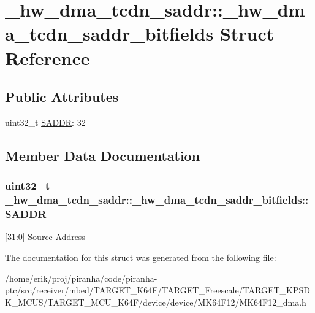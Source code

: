 \hypertarget{struct__hw__dma__tcdn__saddr_1_1__hw__dma__tcdn__saddr__bitfields}{}\section{\+\_\+hw\+\_\+dma\+\_\+tcdn\+\_\+saddr\+:\+:\+\_\+hw\+\_\+dma\+\_\+tcdn\+\_\+saddr\+\_\+bitfields Struct Reference}
\label{struct__hw__dma__tcdn__saddr_1_1__hw__dma__tcdn__saddr__bitfields}
\subsection*{Public Attributes}
\begin{DoxyCompactItemize}
\item 
uint32\+\_\+t \hyperlink{struct__hw__dma__tcdn__saddr_1_1__hw__dma__tcdn__saddr__bitfields_a4cbb565b79503dac8e8d2486a968d316}{S\+A\+D\+DR}\+: 32
\end{DoxyCompactItemize}


\subsection{Member Data Documentation}
\subsubsection[{\texorpdfstring{S\+A\+D\+DR}{SADDR}}]{\setlength{\rightskip}{0pt plus 5cm}uint32\+\_\+t \+\_\+hw\+\_\+dma\+\_\+tcdn\+\_\+saddr\+::\+\_\+hw\+\_\+dma\+\_\+tcdn\+\_\+saddr\+\_\+bitfields\+::\+S\+A\+D\+DR}\hypertarget{struct__hw__dma__tcdn__saddr_1_1__hw__dma__tcdn__saddr__bitfields_a4cbb565b79503dac8e8d2486a968d316}{}\label{struct__hw__dma__tcdn__saddr_1_1__hw__dma__tcdn__saddr__bitfields_a4cbb565b79503dac8e8d2486a968d316}
\mbox{[}31\+:0\mbox{]} Source Address 

The documentation for this struct was generated from the following file\+:\begin{DoxyCompactItemize}
\item 
/home/erik/proj/piranha/code/piranha-\/ptc/src/receiver/mbed/\+T\+A\+R\+G\+E\+T\+\_\+\+K64\+F/\+T\+A\+R\+G\+E\+T\+\_\+\+Freescale/\+T\+A\+R\+G\+E\+T\+\_\+\+K\+P\+S\+D\+K\+\_\+\+M\+C\+U\+S/\+T\+A\+R\+G\+E\+T\+\_\+\+M\+C\+U\+\_\+\+K64\+F/device/device/\+M\+K64\+F12/M\+K64\+F12\+\_\+dma.\+h\end{DoxyCompactItemize}
